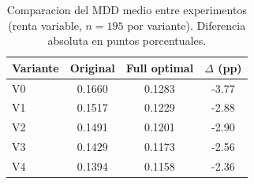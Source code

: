 \begin{table}[ht]
  \centering
  \caption{Comparacion del MDD medio entre experimentos (renta variable, $n=195$ por variante). Diferencia absoluta en puntos porcentuales.}
  \label{tab:mdd_comparison}
  \begin{tabular}{lccc}
    \toprule
    Variante & Original & Full optimal & $\Delta$ (pp) \\
    \midrule
    V0 & 0.1660 & 0.1283 & -3.77 \\
    V1 & 0.1517 & 0.1229 & -2.88 \\
    V2 & 0.1491 & 0.1201 & -2.90 \\
    V3 & 0.1429 & 0.1173 & -2.56 \\
    V4 & 0.1394 & 0.1158 & -2.36 \\
    \bottomrule
  \end{tabular}
\end{table}
